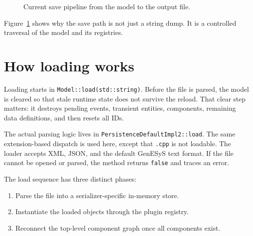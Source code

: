 \begin{figure}[htbp]
\centering
\caption{Current save pipeline from the model to the output file.}
\label{fig:model-persistence-save-pipeline}
\end{figure}

Figure~\ref{fig:model-persistence-save-pipeline} shows why the save path is
not just a string dump. It is a controlled traversal of the model and its
registries.

\section{How loading works}
\label{sec:model-persistence-loading}

Loading starts in \texttt{Model::load(std::string)}. Before the file is parsed,
the model is cleared so that stale runtime state does not survive the reload.
That clear step matters: it destroys pending events, transient entities,
components, remaining data definitions, and then resets all IDs.

The actual parsing logic lives in \texttt{PersistenceDefaultImpl2::load}. The
same extension-based dispatch is used here, except that \texttt{.cpp} is not
loadable. The loader accepts XML, JSON, and the default GenESyS text format.
If the file cannot be opened or parsed, the method returns \texttt{false} and
traces an error.

The load sequence has three distinct phases:
\begin{enumerate}
\item Parse the file into a serializer-specific in-memory store.
\item Instantiate the loaded objects through the plugin registry.
\item Reconnect the top-level component graph once all components exist.
\end{enumerate}

